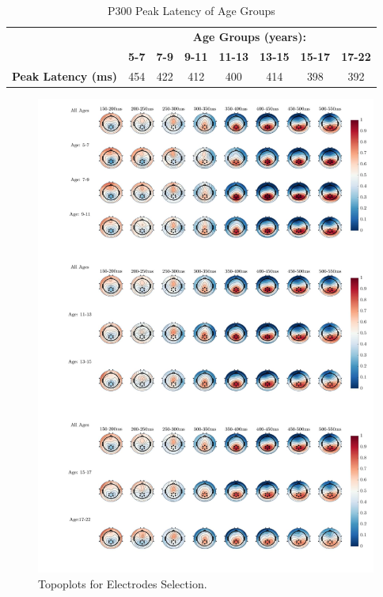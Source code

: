\begin{table}[H]
\centering
\begin{tabular}{lcllllll}
\hline
                           & \multicolumn{7}{c}{\textbf{Age Groups (years):}}                                                                                                                                              \\ 
                           & \multicolumn{1}{l}{\textbf{5-7}} & \textbf{7-9}            & \textbf{9-11}           & \textbf{11-13}          & \textbf{13-15}          & \textbf{15-17}          & \textbf{17-22}          \\\cline{2-8} 
\textbf{Peak Latency (ms)} & 454                              & \multicolumn{1}{c}{422} & \multicolumn{1}{c}{412} & \multicolumn{1}{c}{400} & \multicolumn{1}{c}{414} & \multicolumn{1}{c}{398} & \multicolumn{1}{c}{392} \\ \hline
\end{tabular}
\caption[]{P300 Peak Latency of Age Groups}
\label{tab:peaklatency}

\end{table}


\newpage
\begin{figure}[H]
    \centering
    \includegraphics[width=0.8\linewidth]{Subfigures/topoall.png}
    \caption[]{Topoplots for Electrodes Selection.}
    \label{fig:elecsel}
\end{figure}

